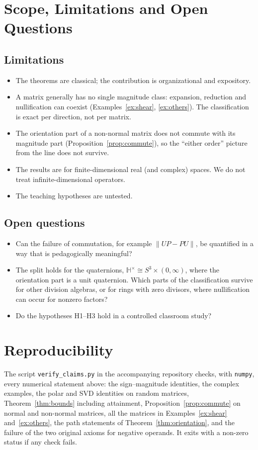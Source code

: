 \documentclass[12pt]{article}
\theoremstyle{definition}
\theoremstyle{remark}
\newcommand{\norm}[1]{\lVert #1\rVert}
\begin{document}
\section{Scope, Limitations and Open Questions}\label{sec:scope}
\subsection{Limitations}
\begin{itemize}
\item The theorems are classical; the contribution is organizational and expository.
\item A matrix generally has no single magnitude class: expansion, reduction and nullification can coexist (Examples~\ref{ex:shear}, \ref{ex:others}). The classification is exact per direction, not per matrix.
\item The orientation part of a non-normal matrix does not commute with its magnitude part (Proposition~\ref{prop:commute}), so the ``either order'' picture from the line does not survive.
\item The results are for finite-dimensional real (and complex) spaces. We do not treat infinite-dimensional operators.
\item The teaching hypotheses are untested.
\end{itemize}

\subsection{Open questions}
\begin{itemize}
\item Can the failure of commutation, for example $\norm{UP-PU}$, be quantified in a way that is pedagogically meaningful?
\item The split holds for the quaternions, $\mathbb{H}^{\times}\cong S^3\times(0,\infty)$, where the orientation part is a unit quaternion. Which parts of the classification survive for other division algebras, or for rings with zero divisors, where nullification can occur for nonzero factors?
\item Do the hypotheses H1--H3 hold in a controlled classroom study?
\end{itemize}

\appendix
\section{Reproducibility}\label{app:repro}
The script \texttt{verify\_claims.py} in the accompanying repository checks, with \texttt{numpy}, every numerical statement above: the sign--magnitude identities, the complex examples, the polar and SVD identities on random matrices, Theorem~\ref{thm:bounds} including attainment, Proposition~\ref{prop:commute} on normal and non-normal matrices, all the matrices in Examples~\ref{ex:shear} and~\ref{ex:others}, the path statements of Theorem~\ref{thm:orientation}, and the failure of the two original axioms for negative operands. It exits with a non-zero status if any check fails.
\end{document}
